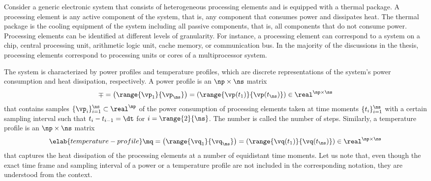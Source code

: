 Consider a generic electronic system that consists of \np heterogeneous
processing elements and is equipped with a thermal package. A processing element
is any active component of the system, that is, any component that consumes
power and dissipates heat. The thermal package is the cooling equipment of the
system including all passive components, that is, all components that do not
consume power. Processing elements can be identified at different levels of
granularity. For instance, a processing element can correspond to a system on a
chip, central processing unit, arithmetic logic unit, cache memory, or
communication bus. In the majority of the discussions in the thesis, processing
elements correspond to processing units or cores of a multiprocessor system.

The system is characterized by power profiles and temperature profiles, which
are discrete representations of the system's power consumption and heat
dissipation, respectively. A power profile is an $\np \times \ns$ matrix
\[
  \mp
  = \left(\range{\vp_1}{\vp_\ns}\right)
  = \left(\range{\vp(t_1)}{\vp(t_\ns)}\right) \in \real^{\np \times \ns}
\]
that contains \ns samples $\{ \vp_i \}_{i = 1}^\ns \subset \real^\np$ of the
power consumption of \np processing elements taken at \ns time moments $\{ t_i
\}_{i = 1}^\ns$ with a certain sampling interval \dt such that $t_i - t_{i - 1}
= \dt$ for $i = \range{2}{\ns}$. The number \ns is called the number of steps.
Similarly, a temperature profile is an $\np \times \ns$ matrix
\begin{equation} \elab{temperature-profile}
  \mq
  = \left(\range{\vq_1}{\vq_\ns}\right)
  = \left(\range{\vq(t_1)}{\vq(t_\ns)}\right) \in \real^{\np \times \ns}
\end{equation}
that captures the heat dissipation of the processing elements at a number of
equidistant time moments. Let us note that, even though the exact time frame and
sampling interval of a power or a temperature profile are not included in the
corresponding notation, they are understood from the context.
